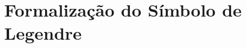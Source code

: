 \begin{enumerate}[label=\textbf{\roman*.}]
\begin{enumerate}[label=\textbf{\roman{enumi}.(\alph*)}]
        \end{enumerate}



\end{enumerate}


\section{Formalização do Símbolo de Legendre}
\label{sec:form-legendre}


